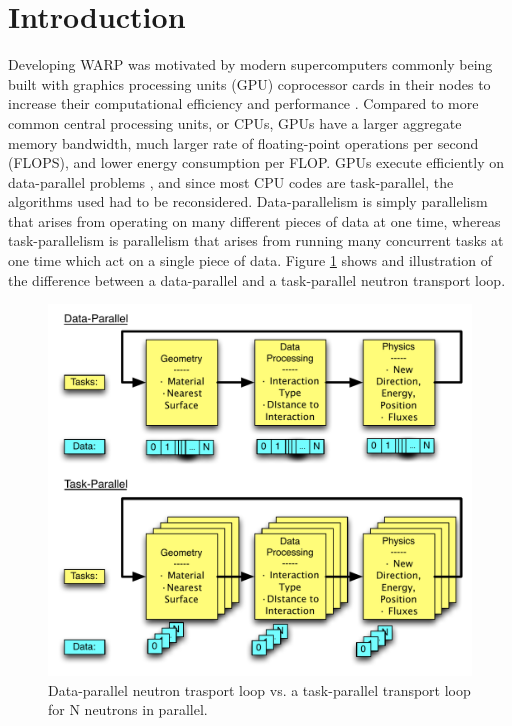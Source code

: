 \documentclass[preprint,12pt]{elsarticle}
\begin{document}
\linenumbers


\section{Introduction}
\label{sec:intro}

Developing WARP was motivated by modern supercomputers commonly being built with graphics processing units (GPU) coprocessor cards in their nodes to increase their computational efficiency and performance \cite{}.  Compared to more common central processing units, or CPUs, GPUs have a larger aggregate memory bandwidth, much larger rate of floating-point operations per second (FLOPS), and lower energy consumption per FLOP\cite{}.  GPUs execute efficiently on data-parallel problems \cite{}, and since most CPU codes are task-parallel, the algorithms used had to be reconsidered.  Data-parallelism is simply parallelism that arises from operating on many different pieces of data at one time, whereas task-parallelism is parallelism that arises from running many concurrent tasks at one time which act on a single piece of data.   Figure \ref{datavtask} shows and illustration of the difference between a data-parallel and a task-parallel neutron transport loop.

\begin{figure}[h!] 
  \centering
    \includegraphics[width=\textwidth]{graphics/datavtask.pdf}
     \caption{Data-parallel neutron trasport loop vs. a task-parallel transport loop for N neutrons in parallel.  \label{datavtask} }
\end{figure}
\end{document}
